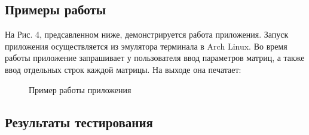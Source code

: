 \documentclass[a4paper,12pt]{article}
\begin{document}
\subsection{Примеры работы}
На Рис. 4, предсавленном ниже, демонстрируется работа приложения. Запуск приложения осуществляется из  эмулятора терминала  в  Arch Linux. Во время работы приложение запрашивает у пользователя ввод параметров матриц, а также ввод отдельных строк каждой матрицы. На выходе она печатает:
\begin{figure}[h]
\caption{Пример работы приложения}
\label{images:example}
\end{figure}

\newpage
\subsection{Результаты тестирования}
\end{document}
